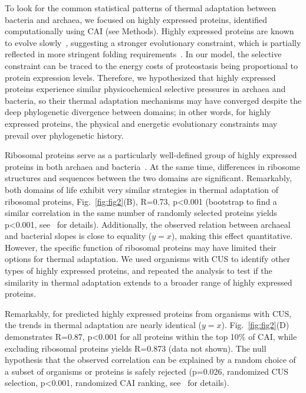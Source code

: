 \documentclass[10pt,letterpaper]{article}
\begin{document}
To look for the common statistical patterns of thermal adaptation between bacteria and archaea, we focused on highly expressed proteins, identified computationally using CAI (see Methods). Highly expressed proteins are known to evolve slowly~\cite{Pal2001Highly,Rocha2004An}, suggesting a stronger evolutionary constraint, which is partially reflected in more stringent folding requirements~\cite{Serohijos2012Protein,Drummond2005Why,Drummond2008MistranslationInduced}. %
In our model, the selective constraint can be traced to the energy costs of proteostasis being proportional to protein expression levels. Therefore, we hypothesized that highly expressed proteins experience similar physicochemical selective pressures in archaea and bacteria, so their thermal adaptation mechanisms may have converged despite the deep phylogenetic divergence between domains; in other words, for highly expressed proteins, the physical and energetic evolutionary constraints may prevail over phylogenetic history.

Ribosomal proteins serve as a particularly well-defined group of highly expressed proteins in both archaea and bacteria~\cite{Karlin2005Predicted}. At the same time, differences in ribosome structures and sequences between the two domains are significant. Remarkably, both domains of life exhibit very similar strategies in thermal adaptation of ribosomal proteins, Fig.~\ref{fig:fig2}(B), R=0.73, p\textless 0.001 (bootstrap to find a similar correlation in the same number of randomly selected proteins yields p\textless0.001, see~ for details). Additionally, the observed relation between archaeal and bacterial slopes is close to equality ($y=x$), making this effect quantitative. However, the specific function of ribosomal proteins may have limited their options for thermal adaptation. We used organisms with CUS to identify other types of highly expressed proteins, and repeated the analysis to test if the similarity in thermal adaptation extends to a broader range of highly expressed proteins.

Remarkably, for predicted highly expressed proteins from organisms with CUS, the trends in thermal adaptation are nearly identical ($y=x$). Fig.~\ref{fig:fig2}(D) demonstrates R=0.87, p\textless 0.001 for all proteins within the top 10\% of CAI, while excluding ribosomal proteins yields R=0.873 (data not shown). The null hypothesis that the observed correlation can be explained by a random choice of a subset of organisms or proteins is safely rejected (p=0.026, randomized CUS selection,  p\textless0.001, randomized CAI ranking, see~ for details).
\end{document}
